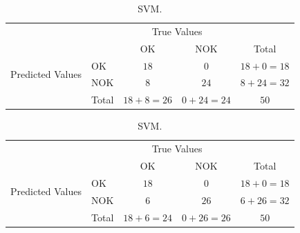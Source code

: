 \documentclass[5p,times,procedia]{elsarticle}
\begin{document}
\begin{table}
       \begin{subtable}[h]{0.3\textwidth}
              \centering
              \begin{adjustbox}{width=1.6\textwidth}
              \begin{tabular}{l|l|c|c|c}
                     \multicolumn{2}{c}{}&\multicolumn{2}{c}{True Values}&\\
                     \cline{3-4}
                     \multicolumn{2}{c|}{}& OK & NOK &\multicolumn{1}{c}{Total}\\
                     \cline{2-4}
                     \multirow{2}{*}{Predicted Values}& OK & $18$ & $0$ & $18+0 = 18$\\
                     \cline{2-4}
                     & NOK & $8$ & $24$ & $8+24 = 32$\\
                     \cline{2-4}
                     \multicolumn{1}{c}{} & \multicolumn{1}{c}{Total} & \multicolumn{1}{c}{$18+8 = 26$} & \multicolumn{    1}{c}{$0+24 = 24$} & \multicolumn{1}{c}{$50$}\\
              \end{tabular}
              \end{adjustbox}
              \caption{SVM.}
              \label{tab:SVM_conf_matrix}
       \end{subtable}
       \begin{subtable}[h]{0.3\textwidth}
              \centering
              \begin{adjustbox}{width=1.6\textwidth}
              \begin{tabular}{l|l|c|c|c}
                     \multicolumn{2}{c}{}&\multicolumn{2}{c}{True Values}&\\
                     \cline{3-4}
                     \multicolumn{2}{c|}{}& OK & NOK &\multicolumn{1}{c}{Total}\\
                     \cline{2-4}
                     \multirow{2}{*}{Predicted Values}& OK & $18$ & $0$ & $18+0 = 18$\\
                     \cline{2-4}
                     & NOK & $6$ & $26$ & $6+26 = 32$\\
                     \cline{2-4}
                     \multicolumn{1}{c}{} & \multicolumn{1}{c}{Total} & \multicolumn{1}{c}{$18+6 = 24$} & \multicolumn{    1}{c}{$0+26 = 26$} & \multicolumn{1}{c}{$50$}\\
              \end{tabular}
              \end{adjustbox}

\end{subtable}
\end{table}
\end{document}

